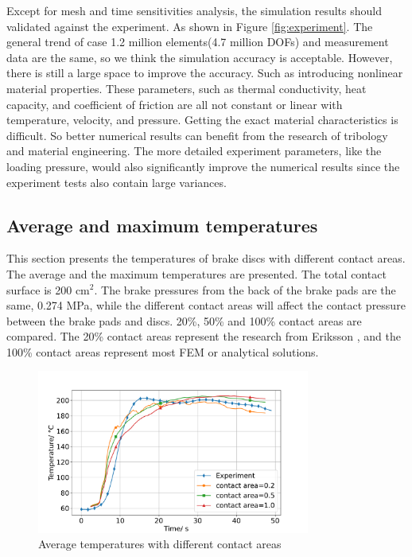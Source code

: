 Except for mesh and time sensitivities analysis, the simulation results should validated against the experiment. As shown in Figure \ref{fig:experiment}. The general trend of case 1.2 million elements(4.7 million DOFs) and measurement data are the same, so we think the simulation accuracy is acceptable. However, there is still a large space to improve the accuracy. Such as introducing nonlinear material properties. These parameters, such as thermal conductivity, heat capacity, and coefficient of friction are all not constant or linear with temperature, velocity, and pressure. Getting the exact material characteristics is difficult. So better numerical results can benefit from the research of tribology and material engineering. The more detailed experiment parameters, like the loading pressure, would also significantly improve the numerical results since the experiment tests also contain large variances.



\subsection*{Average and maximum temperatures}

This section presents the temperatures of brake discs with different contact areas. The average and the maximum temperatures are presented.
The total contact surface is 200 cm$^2$. The brake pressures from the back of the brake pads are the same, 0.274 MPa, while the different contact areas will affect the contact pressure between the brake pads and discs. 20\%, 50\% and 100\% contact areas are compared. The 20\% contact areas represent the research from Eriksson \cite{eriksson_nature_2002}, and the 100\% contact areas represent most FEM or analytical solutions.

\begin{figure}[h]
    \centering
    \includegraphics[width=0.8\textwidth]{book/chapters/zhang/graphics/T_ave_dc.pdf}
    \caption{Average temperatures with different contact areas}
    \label{fig:T_ave}
\end{figure}

